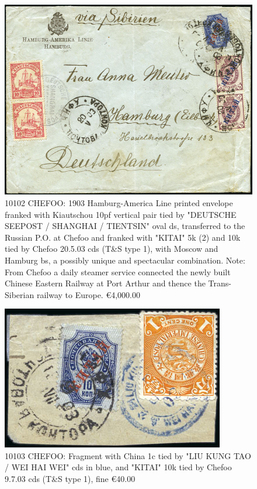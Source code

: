 \begin{figure}[htbp]
\centering
\includegraphics[width=.95\textwidth]{../russian-post-offices-in-china/10102.jpg}
\caption{
10102 CHEFOO: 1903 Hamburg-America Line printed envelope franked with 
Kiautschou 10pf vertical pair tied by "DEUTSCHE SEEPOST / SHANGHAI / TIENTSIN" 
oval ds, transferred to the Russian P.O. at Chefoo and franked with "KITAI" 5k (2) 
and 10k tied by Chefoo 20.5.03 cds (T\&S type 1), with Moscow and 
Hamburg bs, a possibly unique and spectacular combination.
Note: From Chefoo a daily steamer service connected the newly 
built Chinese Eastern Railway at Port Arthur and thence the Trans-Siberian 
railway to Europe.
\euro 4,000.00
}  
\end{figure} 

\begin{figure}[htbp]
\centering
\includegraphics[width=.50\textwidth]{../russian-post-offices-in-china/10103.jpg}
\caption{
10103 CHEFOO: Fragment with China 1c tied by "LIU KUNG TAO / WEI HAI WEI" cds 
in blue, and "KITAI" 10k tied by Chefoo 9.7.03 cds (T\&S type 1), fine
\euro 40.00 
}  
\end{figure} 

